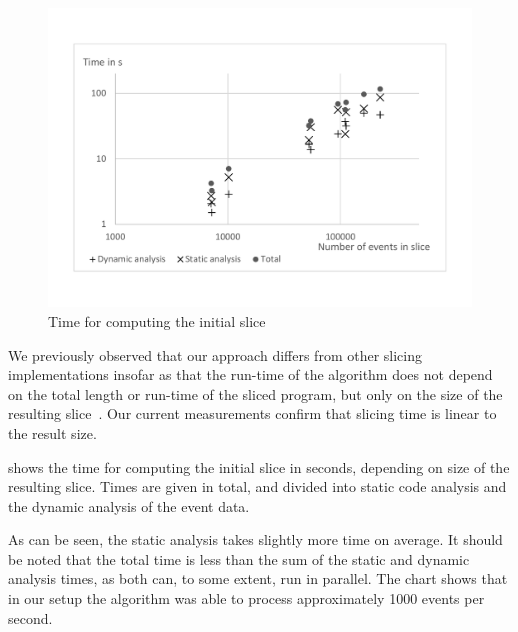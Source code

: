 \documentclass[
			english,
			review,
			]{elsarticle}
\begin{document}
\begin{figure}
	\centering
		\includegraphics[width=\linewidth, clip, trim={20mm 26mm 20mm 26mm}]{chart-initial.pdf}
	\caption{Time for computing the initial slice}
	\label{fig:chartinitial}
\end{figure}

We previously observed that our approach differs from other slicing implementations insofar as that the run-time of the algorithm does not depend on the total length or run-time of the sliced program, but only on the size of the resulting slice~\cite{treffer_dynamic_2014}.
Our current measurements confirm that slicing time is linear to the result size.

 shows the time for computing the initial slice in seconds, depending on size of the resulting slice.
Times are given in total, and divided into static code analysis and the dynamic analysis of the event data.

As can be seen, the static analysis takes slightly more time on average.
It should be noted that the total time is less than the sum of the static and dynamic analysis times, as both can, to some extent, run in parallel.
The chart shows that in our setup the algorithm was able to process approximately 1000 events per second.
\end{document}
